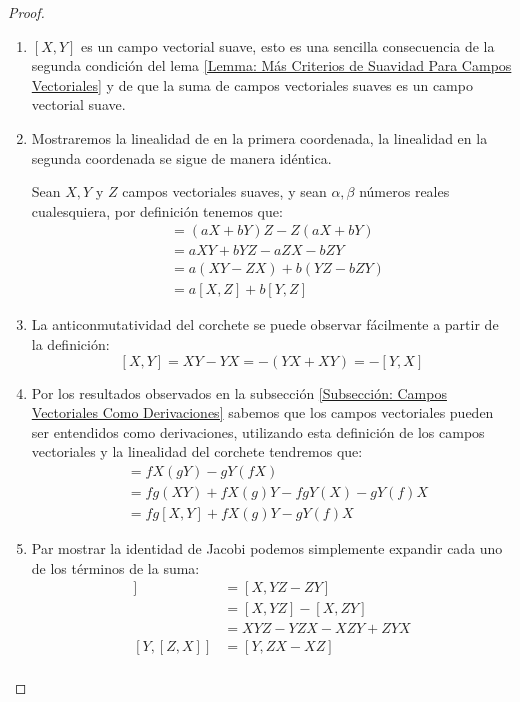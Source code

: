 \begin{proof}
	\phantom{ }
	\begin{enumerate}
		\item $[X,Y]$ es un campo vectorial suave, esto es una sencilla consecuencia de la segunda condición del lema \ref{Lemma: Más Criterios de Suavidad Para Campos Vectoriales} y de que la suma de campos vectoriales suaves es un campo vectorial suave.
		\item Mostraremos la linealidad de en la primera coordenada, la linealidad en la segunda coordenada se sigue de manera idéntica.

		      Sean $X, Y$ y $Z$ campos vectoriales suaves, y sean $\alpha, \beta$ números reales cualesquiera, por definición tenemos que:
		      \begin{align*}
			      [aX + bY, Z] & = (aX + bY)Z  - Z(aX + bY) \\
			                   & = aXY + bYZ - aZX - bZY    \\
			                   & = a(XY - ZX) + b(YZ - bZY) \\
			                   & = a[X,Z] + b[Y,Z]
		      \end{align*}
		\item La anticonmutatividad del corchete se puede observar fácilmente a partir de la definición:
		      \[
			      [X,Y] = XY - YX = -(YX + XY) = -[Y,X]
		      \]
		\item Por los resultados observados en la subsección \ref{Subsección: Campos Vectoriales Como Derivaciones} sabemos que los campos vectoriales pueden ser entendidos como derivaciones, utilizando esta definición de los campos vectoriales y la linealidad del corchete tendremos que:
		      \begin{align*}
			      [fX,gY] & = fX(gY) - gY(fX)                   \\
			              & = fg(XY) + fX(g)Y - fgY(X) - gY(f)X \\
			              & = fg[X,Y] + fX(g)Y - gY(f)X
		      \end{align*}
		\item Par mostrar la identidad de Jacobi podemos simplemente expandir cada uno de los términos de la suma:
		      \begin{align*}
			      [X,[Y,Z]] & = [X,YZ - ZY]           \\
			                & = [X,YZ] - [X,ZY]       \\
			                & = XYZ - YZX - XZY + ZYX \\
			      [Y,[Z,X]] & = [Y,ZX - XZ]           \\

\end{align*}
\end{enumerate}
\end{proof}
